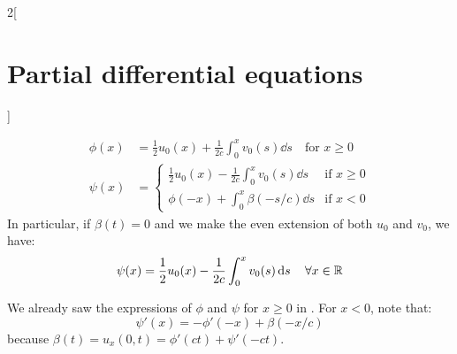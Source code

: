\documentclass[../../../main_math.tex]{subfiles}
\begin{document}
\begin{multicols}{2}[\section{Partial differential equations}]
\begin{proposition}
\begin{align*}
      \phi(x) & =\frac{1}{2}u_0(x)+\frac{1}{2c}\int_0^xv_0(s)\dd{s}\quad\text{for }x\geq 0 \\
      \psi(x) & =
      \begin{cases}
        \displaystyle\frac{1}{2}u_0(x)-\frac{1}{2c}\int_0^xv_0(s)\dd{s} & \text{if } x\geq 0 \\
        \displaystyle\phi(-x)+\int_0^x\beta(-s/c)\dd{s}                 & \text{if } x< 0
      \end{cases}
    \end{align*}
    In particular, if $\beta(t)=0$ and we make the even extension of both $u_0$ and $v_0$, we have:
    \begin{equation*}
      \psi(x) =\frac{1}{2}u_0(x)-\frac{1}{2c}\int_0^xv_0(s)\dd{s} \quad\forall x\in\mathbb{R}
    \end{equation*}
  \end{proposition}
  \begin{sproof}
    We already saw the expressions of $\phi$ and $\psi$ for $x\geq 0$ in . For $x<0$, note that: $$\psi'(x)=-\phi'(-x)+\beta(-x/c)$$ because $\beta(t)=u_x(0,t)=\phi'(ct)+\psi'(-ct)$.
  \end{sproof}

\end{multicols}
\end{document}
